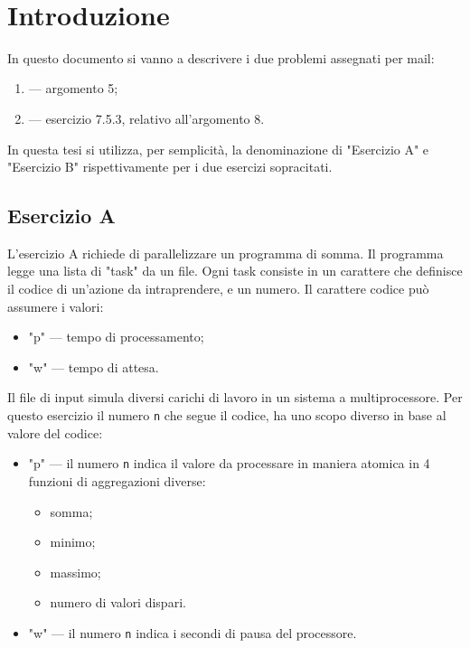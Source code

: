 \documentclass[12pt,a4paper]{article}
\begin{document}
\clearpage
\clearpage
\tableofcontents
\clearpage

\newpage
\
\newpage

\section{Introduzione}
In questo documento si vanno a descrivere i due problemi assegnati per mail:
\begin{enumerate}[label=\Alph*]
    \item — argomento 5;
    \item — esercizio 7.5.3, relativo all'argomento 8.
\end{enumerate}
In questa tesi si utilizza, per semplicità, la denominazione di "Esercizio A" e "Esercizio B" rispettivamente per i due esercizi sopracitati.

\subsection{Esercizio A}
L'esercizio A richiede di parallelizzare un programma di somma.
Il programma legge una lista di "task" da un file.
Ogni task consiste in un carattere che definisce il codice di un'azione da intraprendere, e un numero. Il carattere codice può assumere i valori:
\begin{itemize}
    \item "p" — tempo di processamento;
    \item "w" — tempo di attesa.
\end{itemize}
Il file di input simula diversi carichi di lavoro in un sistema a multiprocessore.
Per questo esercizio il numero \texttt{n} che segue il codice, ha uno scopo diverso in base al valore del codice:
\begin{itemize}
    \item "p" — il numero \texttt{n} indica il valore da processare in maniera atomica in 4 funzioni di aggregazioni diverse:
    \begin{itemize}
        \item somma;
        \item minimo;
        \item massimo;
        \item numero di valori dispari.
    \end{itemize}
    \item "w" — il numero \texttt{n} indica i secondi di pausa del processore.
\end{itemize}
\end{document}
